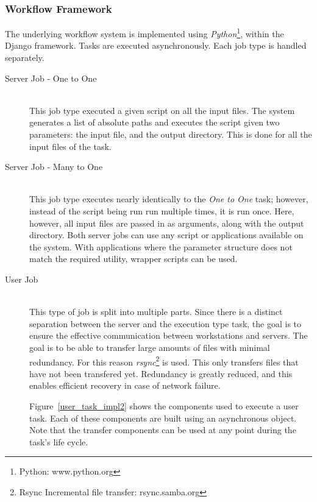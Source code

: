 \subsubsection{Workflow Framework}
The underlying workflow system is implemented using \emph{Python}\footnote{Python: www.python.org}, within
the Django framework. Tasks are executed asynchronously. Each job type is handled separately.
\begin{adjustwidth}{2em}{0em}
\begin{description}
\item[Server Job - One to One] \hfill \\
    This job type executed a given script on all the input files. The system generates a list of
    absolute paths and executes the script given two parameters: the input file, and the output
    directory. This is done for all the input files of the task.
\item[Server Job - Many to One] \hfill \\
    This job type executes nearly identically to the \emph{One to One} task;
    however, instead
    of the script being run run multiple times, it is run once. Here, however, all input files
    are passed in as arguments, along with the output directory. Both server jobs can use
    any script or applications available on the system. With applications where the parameter
    structure does not match the required utility, wrapper scripts can be used.
\item[User Job] \hfill \\
    This type of job is split into multiple parts. Since there is a distinct separation between
    the server and the execution type task, the goal is to ensure the effective communication
    between workstations and servers. The goal is to be able to transfer large amounts of files
    with minimal redundancy. For this reason \emph{rsync}\footnote{Rsync Incremental file
    transfer: rsync.samba.org} is used. This only transfers files that have not been transfered
    yet. Redundancy is greatly reduced, and this enables efficient recovery in case of network failure.

    Figure~\ref{user_task_impl2} shows the components used to execute a user task. Each of these components
    are built using an asynchronous object. Note that the transfer components can be used at any point
    during the task's life cycle.
\end{description}
\end{adjustwidth}
